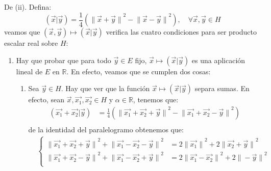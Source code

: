 \documentclass[12pt]{report}
\theoremstyle{largebreak}
\newcommand\pint[2]{\ensuremath{\left(#1\big|#2\right)}}
\newcommand\norm[1]{\ensuremath{\|#1\|}}
\begin{document}
\begin{sol}
        De (ii). Defina:
        \begin{equation*}
            \pint{\vec{x}}{\vec{y}}=\frac{1}{4}\left(\norm{\vec{x}+\vec{y}}^2-\norm{\vec{x}-\vec{y}}^2 \right),\quad\forall\vec{x},\vec{y}\in H
        \end{equation*}
        veamos que $(\vec{x},\vec{y})\mapsto\pint{\vec{x}}{\vec{y}}$ verifica las cuatro condiciones para ser producto escalar real sobre $H$:
        \begin{enumerate}
            \item Hay que probar que para todo $\vec{y}\in E$ fijo, $\vec{x}\mapsto\pint{\vec{x}}{\vec{y}}$ es una aplicación lineal de $E$ en $\mathbb{R}$. En efecto, veamos que se cumplen dos cosas:
            \begin{enumerate}
                \item Sea $\vec{y}\in H$. Hay que ver que la función $\vec{x}\mapsto\pint{\vec{x}}{\vec{y}}$ separa sumas. En efecto, sean $\vec{x},\vec{x_1},\vec{x_2}\in H$ y $\alpha\in\mathbb{R}$, tenemos que:
                \begin{equation*}
                    \begin{split}
                        \pint{\vec{x_1}+\vec{x_2}}{\vec{y}}&=\frac{1}{4}\left(\norm{\vec{x_1}+\vec{x_2}+\vec{y}}^2-\norm{\vec{x_1}+\vec{x_2}-\vec{y}}^2 \right)\\
                    \end{split}
                \end{equation*}
                de la identidad del paralelogramo obtenemos que:
                \begin{equation*}
                    \begin{split}
                        &\left\{
                            \begin{array}{rl}
                                \norm{\vec{x_1}+\vec{x_2}+\vec{y}}^2+\norm{\vec{x_1}-\vec{x_2}-\vec{y}}^2&=2\norm{\vec{x_1}}^2+2\norm{\vec{x_2}+\vec{y}}^2\\
                                \norm{\vec{x_1}+\vec{x_2}-\vec{y}}^2+\norm{\vec{x_1}-\vec{x_2}+\vec{y}}^2&=2\norm{\vec{x_1}-\vec{x_2}}^2+2\norm{-\vec{y}}^2\\
                            \end{array}
                        \right.\\
                    \end{split}
                \end{equation*}

\end{enumerate}
\end{enumerate}
\end{sol}
\end{document}
